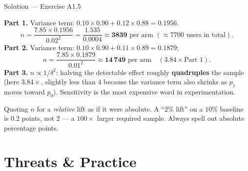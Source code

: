 \documentclass[aspectratio=169,11pt]{beamer}
\begin{document}
\begin{frame}{Solution --- Exercise A1.5}
\begin{solutionbox}
  \textbf{Part 1.} Variance term: $0.10 \times 0.90 + 0.12 \times 0.88 = 0.1956$.
  \[
    n = \frac{7.85 \times 0.1956}{0.02^2} = \frac{1.535}{0.0004} \approx \mathbf{3839}
    \text{ per arm } (\approx 7700 \text{ users in total}).
  \]
  \textbf{Part 2.} Variance term: $0.10\times0.90 + 0.11\times0.89 = 0.1879$;
  \[
    n = \frac{7.85 \times 0.1879}{0.01^2} \approx \mathbf{14\,749} \text{ per arm}
    \quad (3.84\times \text{Part 1}).
  \]
  \textbf{Part 3.} $n \propto 1/\delta^2$: halving the detectable effect roughly
  \textbf{quadruples} the sample (here $3.84\times$, slightly less than $4$ because the
  variance term also shrinks as $p_1$ moves toward $p_0$). Sensitivity is the most
  expensive word in experimentation.
\end{solutionbox}
\begin{mistake}
  Quoting $n$ for a \emph{relative} lift as if it were absolute. A ``$2\%$ lift'' on a
  $10\%$ baseline is $0.2$ points, not $2$ --- a $100\times$ larger required sample.
  Always spell out absolute percentage points.
\end{mistake}
\end{frame}

\section{Threats \& Practice}
\end{document}

